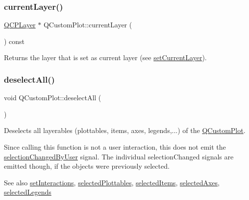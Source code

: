 \subsubsection{\texorpdfstring{currentLayer()}{currentLayer()}}
{\footnotesize\ttfamily \mbox{\hyperlink{class_q_c_p_layer}{Q\+C\+P\+Layer}} $\ast$ Q\+Custom\+Plot\+::current\+Layer (\begin{DoxyParamCaption}{ }\end{DoxyParamCaption}) const}

Returns the layer that is set as current layer (see \mbox{\hyperlink{class_q_custom_plot_a73a6dc47c653bb6f8f030abca5a11852}{set\+Current\+Layer}}). \mbox{\label{class_q_custom_plot_a9d4808ab925b003054085246c92a257c}} 
\subsubsection{\texorpdfstring{deselectAll()}{deselectAll()}}
{\footnotesize\ttfamily void Q\+Custom\+Plot\+::deselect\+All (\begin{DoxyParamCaption}{ }\end{DoxyParamCaption})}

Deselects all layerables (plottables, items, axes, legends,...) of the \mbox{\hyperlink{class_q_custom_plot}{Q\+Custom\+Plot}}.

Since calling this function is not a user interaction, this does not emit the \mbox{\hyperlink{class_q_custom_plot_a500c64a109bc773c973ad274f2fa4190}{selection\+Changed\+By\+User}} signal. The individual selection\+Changed signals are emitted though, if the objects were previously selected.

\begin{DoxySeeAlso}{See also}
\mbox{\hyperlink{class_q_custom_plot_a5ee1e2f6ae27419deca53e75907c27e5}{set\+Interactions}}, \mbox{\hyperlink{class_q_custom_plot_a747faaab57c56891e901a1e97fa4359a}{selected\+Plottables}}, \mbox{\hyperlink{class_q_custom_plot_afda487bcf2d6cf1a57173d82495e29ba}{selected\+Items}}, \mbox{\hyperlink{class_q_custom_plot_a7e6b07792b1cb2c31681596582d14dbe}{selected\+Axes}}, \mbox{\hyperlink{class_q_custom_plot_ac87624ddff1cbf4064781a8e8ae321c4}{selected\+Legends}} 
\end{DoxySeeAlso}
\mbox{\label{class_q_custom_plot_ad7a7d878bf050f101a43008e7d8fdb52}} 
